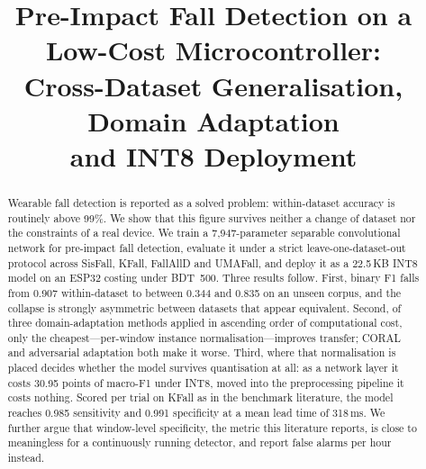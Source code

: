 \documentclass[conference]{IEEEtran}
\begin{document}
\title{Pre-Impact Fall Detection on a Low-Cost Microcontroller:\\
Cross-Dataset Generalisation, Domain Adaptation\\ and INT8 Deployment}

\author{
}

\maketitle

\begin{abstract}
Wearable fall detection is reported as a solved problem: within-dataset accuracy is
routinely above 99\%. We show that this figure survives neither a change of dataset
nor the constraints of a real device. We train a 7{,}947-parameter separable
convolutional network for pre-impact fall detection, evaluate it under a strict
leave-one-dataset-out protocol across SisFall, KFall, FallAllD and UMAFall, and deploy
it as a 22.5\,KB INT8 model on an ESP32 costing under BDT~500. Three results follow.
First, binary F1 falls from 0.907 within-dataset to between 0.344 and 0.835 on an
unseen corpus, and the collapse is strongly asymmetric between datasets that appear
equivalent. Second, of three domain-adaptation methods applied in ascending order of
computational cost, only the cheapest---per-window instance normalisation---improves
transfer; CORAL and adversarial adaptation both make it worse. Third, where that
normalisation is placed decides whether the model survives quantisation at all: as a
network layer it costs 30.95 points of macro-F1 under INT8, moved into the
preprocessing pipeline it costs nothing. Scored per trial on KFall as in the
benchmark literature, the model reaches 0.985 sensitivity and 0.991 specificity at a
mean lead time of 318\,ms. We further argue that window-level specificity, the metric
this literature reports, is close to meaningless for a continuously running detector,
and report false alarms per hour instead.
\end{abstract}
\end{document}
